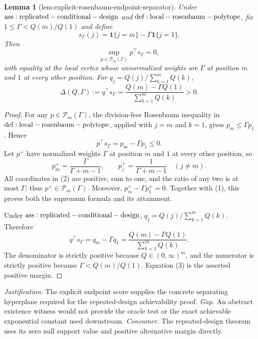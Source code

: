 \documentclass{article}
\newtheorem{lemma}{Lemma}
\begin{document}
\begin{lemma}[lem:explicit-rosenbaum-endpoint-separator]\label{lem:explicit-rosenbaum-endpoint-separator}
Under \({\rm ass:replicated-conditional-design}\) and \({\rm def:local-rosenbaum-polytope}\), fix \(1\leq\Gamma<Q(m)/Q(1)\) and define
\[
 s_\Gamma(j)=\mathbf 1\{j=m\}-\Gamma\mathbf 1\{j=1\}.
\]
Then
\[
 \sup_{p\in\mathcal P_m(\Gamma)}p^\top s_\Gamma=0,
\]
with equality at the local vertex whose unnormalized weights are \(\Gamma\) at position \(m\) and \(1\) at every other position. For \(q_j=Q(j)/\sum_{k=1}^mQ(k)\),
\[
 \Delta(Q,\Gamma):=q^\top s_\Gamma=\frac{Q(m)-\Gamma Q(1)}{\sum_{k=1}^mQ(k)}>0.
\]
\end{lemma}
\begin{proof}
For any \(p\in\mathcal P_m(\Gamma)\), the division-free Rosenbaum inequality in \({\rm def:local-rosenbaum-polytope}\), applied with \(j=m\) and \(k=1\), gives \(p_m\leq\Gamma p_1\). Hence
\[
 p^\top s_\Gamma=p_m-\Gamma p_1\leq0.\tag{1}
\]
Let \(p^+\) have normalized weights \(\Gamma\) at position \(m\) and \(1\) at every other position, so
\[
 p_m^+=\frac{\Gamma}{\Gamma+m-1},\qquad p_j^+=\frac1{\Gamma+m-1}\quad(j\neq m).\tag{2}
\]
All coordinates in (2) are positive, sum to one, and the ratio of any two is at most \(\Gamma\); thus \(p^+\in\mathcal P_m(\Gamma)\). Moreover, \(p_m^+-\Gamma p_1^+=0\). Together with (1), this proves both the supremum formula and its attainment.

Under \({\rm ass:replicated-conditional-design}\), \(q_j=Q(j)/\sum_{k=1}^mQ(k)\). Therefore
\[
 q^\top s_\Gamma=q_m-\Gamma q_1=\frac{Q(m)-\Gamma Q(1)}{\sum_{k=1}^mQ(k)}.\tag{3}
\]
The denominator is strictly positive because \(Q\in(0,\infty)^m\), and the numerator is strictly positive because \(\Gamma<Q(m)/Q(1)\). Equation (3) is the asserted positive margin.
\end{proof}
\par\smallskip\noindent \textit{Justification.} The explicit endpoint score supplies the concrete separating hyperplane required for the repeated-design achievability proof. \textit{Gap.} An abstract existence witness would not provide the oracle test or the exact achievable exponential constant used downstream. \textit{Consumer.} The repeated-design theorem uses its zero null support value and positive alternative margin directly.
\end{document}
